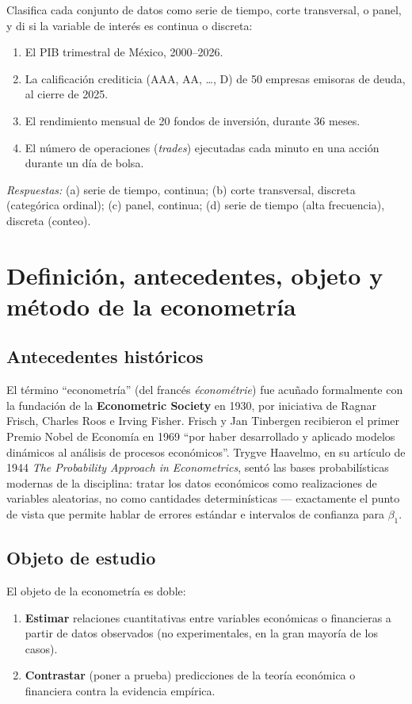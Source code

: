 \documentclass[11pt,a4paper,oneside]{article}
\theoremstyle{definition}
\begin{document}
\begin{practiceBox}
Clasifica cada conjunto de datos como serie de tiempo, corte transversal, o
panel, y di si la variable de interés es continua o discreta:
\begin{enumerate}[label=(\alph*)]
\item El PIB trimestral de México, 2000--2026.
\item La calificación crediticia (AAA, AA, \dots, D) de 50 empresas emisoras de deuda, al cierre de 2025.
\item El rendimiento mensual de 20 fondos de inversión, durante 36 meses.
\item El número de operaciones (\emph{trades}) ejecutadas cada minuto en una acción durante un día de bolsa.
\end{enumerate}
\emph{Respuestas:} (a) serie de tiempo, continua; (b) corte transversal,
discreta (categórica ordinal); (c) panel, continua; (d) serie de tiempo (alta
frecuencia), discreta (conteo).
\end{practiceBox}

\section{Definición, antecedentes, objeto y método de la econometría}

\subsection{Antecedentes históricos}
El término ``econometría'' (del francés \emph{économétrie}) fue acuñado
formalmente con la fundación de la \textbf{Econometric Society} en 1930, por
iniciativa de Ragnar Frisch, Charles Roos e Irving Fisher. Frisch y Jan
Tinbergen recibieron el primer Premio Nobel de Economía en 1969
``por haber desarrollado y aplicado modelos dinámicos al análisis de
procesos económicos''. Trygve Haavelmo, en su artículo de 1944 \emph{The
Probability Approach in Econometrics}, sentó las bases probabilísticas
modernas de la disciplina: tratar los datos económicos como realizaciones de
variables aleatorias, no como cantidades determinísticas --- exactamente el
punto de vista que permite hablar de errores estándar e intervalos de
confianza para $\beta_1$.

\subsection{Objeto de estudio}
El objeto de la econometría es doble:
\begin{enumerate}[nosep]
\item \textbf{Estimar} relaciones cuantitativas entre variables económicas o financieras a partir de datos observados (no experimentales, en la gran mayoría de los casos).
\item \textbf{Contrastar} (poner a prueba) predicciones de la teoría económica o financiera contra la evidencia empírica.
\end{enumerate}
\end{document}
